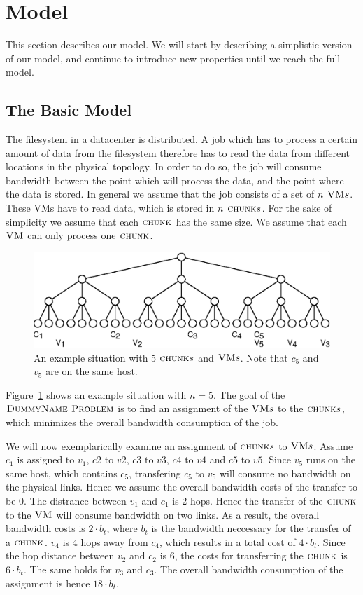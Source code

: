 \section{Model}

This section describes our model. We will start by describing a simplistic version of our model, and continue to introduce new properties until we reach the full model.

\subsection{The Basic Model}

The filesystem in a datacenter is distributed. A job which has to process a certain amount of data from the filesystem therefore has to read the data from different locations in the physical topology. In order to do so, the job will consume bandwidth between the point which will process the data, and the point where the data is stored. In general we assume that the job consists of a set of $n$ $\textsc{VM} s$. These VMs have to read data, which is stored in $n$ $\textsc{chunk} s$. For the sake of simplicity we assume that each $\textsc{chunk}$ has the same size. We assume that each $\textsc{VM}$ can only process one $\textsc{chunk}$. 

\begin{figure}[htbp]
\includegraphics[width = \columnwidth]{figs/basic_scenario_3.eps}
\caption{An example situation with 5 $\textsc{chunk} s$ and $\textsc{VM} s$. Note that $c_5$ and $v_5$ are on the same host.}
\label{fig:model_clean}
\end{figure}



Figure~\ref{fig:model_clean} shows an example situation with $n = 5$. The goal of the $\textsc{DummyName Problem}$  is to find an assignment of the $\textsc{VM} s$ to the $\textsc{chunk} s$, which minimizes the overall bandwidth consumption of the job. 

We will now exemplarically examine an assignment of $\textsc{chunk} s$ to $\textsc{VM} s$. Assume $c_1$ is assigned to $v_1$, $c2$ to $v2$, $c3$ to $v3$, $c4$ to $v4$ and $c5$ to $v5$. Since $v_5$ runs on the same host, which contains $c_5$, transfering $c_5$ to $v_5$ will consume no bandwidth on the physical links. Hence we assume the overall bandwidth costs of the transfer to be $0$. The distrance between $v_1$ and $c_1$ is $2$ hops. Hence the transfer of the $\textsc{chunk}$ to the $\textsc{VM}$ will consume bandwidth on two links. As a result, the overall bandwidth costs is $2 \cdot b_t$, where $b_t$ is the bandwidth neccessary for the transfer of a $\textsc{chunk}$. $v_4$ is $4$ hops away from $c_4$, which results in a total cost of $4 \cdot b_t$. Since the hop distance between $v_2$ and $c_2$ is 6, the costs for transferring the $\textsc{chunk}$ is $6 \cdot b_t$. The same holds for $v_3$ and $c_3$. The overall bandwidth consumption of the assignment is hence $18 \cdot b_t$. 

